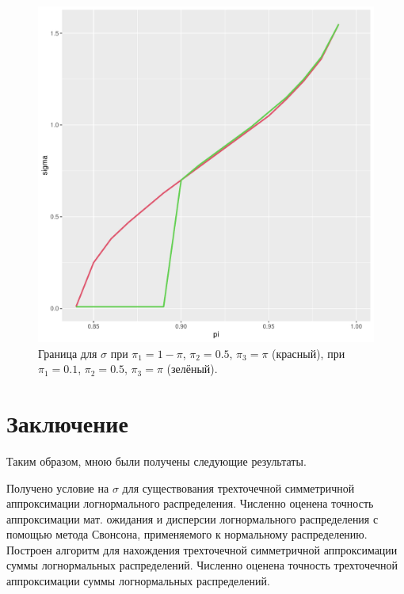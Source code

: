 \documentclass[12pt]{article}
\begin{document}
\begin{figure}[!hhh]
	\begin{center}
		\begin{minipage}[h]{0.95\linewidth}
			\includegraphics[width=1\linewidth]{img/sigma_12.pdf}
			\caption{Граница для $\sigma$ при $\pi_{1} = 1-\pi$, $\pi_{2} = 0.5$, $\pi_{3} = \pi$ (красный), при $\pi_{1} = 0.1$, $\pi_{2} = 0.5$, $\pi_{3} = \pi$ (зелёный). } %
			\label{ris12} %
		\end{minipage}
	\end{center}
\end{figure}


	\clearpage
	\section{Заключение}
	
	Таким образом, мною были получены следующие результаты. 
	
	Получено условие на $\sigma$ для существования трехточечной симметричной аппроксимации логнормального распределения.
	Численно оценена точность аппроксимации мат. ожидания и дисперсии логнормального распределения с помощью метода Свонсона, применяемого к нормальному распределению.
	Построен алгоритм для нахождения трехточечной симметричной аппроксимации суммы логнормальных распределений.
	Численно оценена точность трехточечной аппроксимации суммы логнормальных распределений.
	
\end{document}
